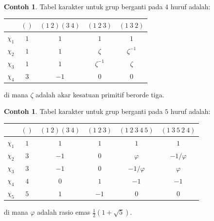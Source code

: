 \documentclass[12pt]{article}
\theoremstyle{plain}
\theoremstyle{definition}
\newtheorem{example}[theorem]{Contoh}
\theoremstyle{remark}
\numberwithin{equation}{section}
\begin{document}
\begin{example}
Tabel karakter untuk grup berganti pada $4$ huruf
adalah:
\begin{center}
\begin{tabular}{|c|c|c|c|c|}
\hline 
 & $()$ & $(1\ 2)(3\ 4)$ & $(1\ 2\ 3)$ & $(1\ 3\ 2)$\\
\hline 
\hline 
$\chi_1$ & $1$ & $1$ & $1$ & $1$\\
\hline 
$\chi_2$ & $1$ & $1$ & $\zeta$ & $\zeta^{-1}$\\
\hline 
$\chi_3$ & $1$ & $1$ & $\zeta^{-1}$ & $\zeta$\\
\hline 
$\chi_4$ & $3$ & $-1$ & $0$ & $0$\\
\hline
\end{tabular}
\end{center}
di mana $\zeta$ adalah akar kesatuan primitif berorde tiga.
\end{example}

\begin{example}
Tabel karakter untuk grup berganti pada $5$ huruf
adalah:
\begin{center}
\begin{tabular}{|c|c|c|c|c|c|}
\hline 
 & $()$ & $(1\ 2)(3\ 4)$ & $(1\ 2\ 3)$ & $(1\ 2\ 3\ 4\ 5)$ & $(1\ 3\ 5\ 2\ 4)$\\
\hline 
\hline 
$\chi_1$ & $1$ & $1$ & $1$ & $1$ & $1$\\
\hline 
$\chi_2$ & $3$ & $-1$ & $0$ & $\varphi$ & $-1/\varphi$\\
\hline 
$\chi_3$ & $3$ & $-1$ & $0$ & $-1/\varphi$ & $\varphi$\\
\hline 
$\chi_4$ & $4$ & $0$ & $1$ & $-1$ & $-1$\\
\hline 
$\chi_5$ & $5$ & $1$ & $-1$ & $0$ & $0$\\
\hline
\end{tabular}
\end{center}
di mana $\varphi$ adalah rasio emas $\frac{1}{2}(1+\sqrt{5})$.
\end{example}




\end{document}

